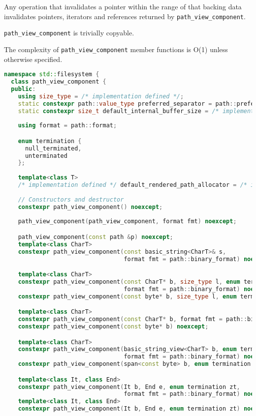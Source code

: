 \documentclass[11pt]{article}
\newcommand{\code}[2][cpp]{\lstinline[language=#1,basicstyle=\small\ttfamily]{#2}}
\begin{document}
Any operation that invalidates a pointer within the range of that backing data invalidates pointers, iterators and references returned by \code{path_view_component}.

\code{path_view_component} is trivially copyable.

The complexity of \code{path_view_component} member functions is O(1) unless otherwise specified.

\begin{lstlisting}[language=cpp]
namespace std::filesystem {
  class path_view_component {
  public:
    using size_type = /* implementation defined */;
    static constexpr path::value_type preferred_separator = path::preferred_separator;
    static constexpr size_t default_internal_buffer_size = /* implementation defined */;
    
    using format = path::format;

    enum termination {
      null_terminated,
      unterminated
    };
    
    template<class T>
    /* implementation defined */ default_rendered_path_allocator = /* implementation defined */;
    
    // Constructors and destructor
    constexpr path_view_component() noexcept;
    
    path_view_component(path_view_component, format fmt) noexcept;

    path_view_component(const path &p) noexcept;
    template<class CharT>
    constexpr path_view_component(const basic_string<CharT>& s,
                                  format fmt = path::binary_format) noexcept;

    template<class CharT>
    constexpr path_view_component(const CharT* b, size_type l, enum termination zt,
                                  format fmt = path::binary_format) noexcept;
    constexpr path_view_component(const byte* b, size_type l, enum termination zt) noexcept;

    template<class CharT>
    constexpr path_view_component(const CharT* b, format fmt = path::binary_format) noexcept;
    constexpr path_view_component(const byte* b) noexcept;

    template<class CharT>
    constexpr path_view_component(basic_string_view<CharT> b, enum termination zt,
                                  format fmt = path::binary_format) noexcept;
    constexpr path_view_component(span<const byte> b, enum termination zt) noexcept;

    template<class It, class End>
    constexpr path_view_component(It b, End e, enum termination zt,
                                  format fmt = path::binary_format) noexcept;
    template<class It, class End>
    constexpr path_view_component(It b, End e, enum termination zt) noexcept;


\end{lstlisting}
\end{document}
